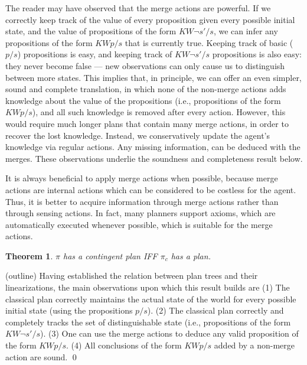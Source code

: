 \documentclass[letterpaper]{article}
\numberwithin{equation}{section}	%
\newtheorem{theorem}{Theorem}
\begin{document}
The reader may have observed that the merge actions are powerful. If we correctly keep track
of the value of every proposition given every possible initial state, and the value of propositions of the form
$KW\neg s'/s$, we can infer any propositions of the form $KWp/s$ that is currently true.
Keeping track of basic ($p/s$) propositions is easy, and keeping track of $KW\neg s'/s$ propositions is also easy:
they never become false --- new observations can only cause us to distinguish between more states.
This implies that, in principle, we can offer an even simpler, sound and complete translation, in which none of the
non-merge actions adds knowledge about the value of the propositions (i.e., propositions of the form $KWp/s$), and all such knowledge is removed after every action.
However, this would require much longer plans that contain many merge actions, in order to recover the lost knowledge.
Instead, we conservatively update the agent's knowledge via regular actions. Any missing information, can be
deduced with the merges. These observations underlie the soundness and completeness result below.

It is always beneficial to apply merge actions when possible, because merge actions are internal actions which can be considered to be costless for the agent. Thus, it is better to acquire information through merge actions rather than through sensing actions. In fact, many planners support axioms, which are automatically executed whenever possible, which is suitable for the merge actions.

\begin{theorem}
$\pi$ has a contingent plan IFF $\pi_c$ has a plan.
\end{theorem}
\proof (outline) Having established the relation between plan trees and their linearizations,
the main observations upon which this result builds are (1) The classical plan correctly maintains the actual state of the world
for every possible initial state (using the propositions $p/s$). (2) The classical plan correctly and completely tracks the set of
distinguishable state (i.e., propositions of the form $KW\neg s'/s$).
(3) One can use the merge actions to deduce any valid proposition of the form $KWp/s$.
(4) All conclusions of the form $KWp/s$ added by a non-merge action are sound.
\qed
\end{document}

